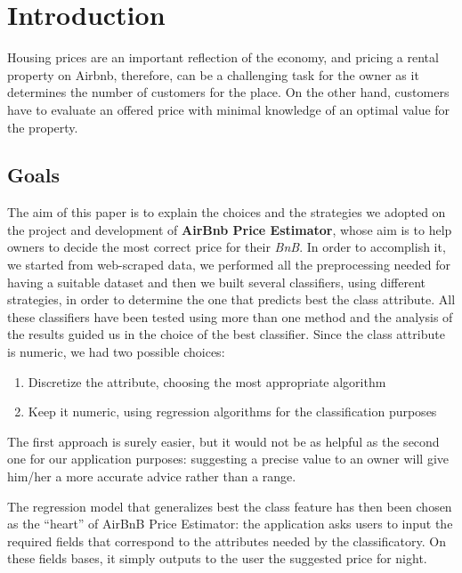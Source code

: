 \section{Introduction}
Housing prices are an important reflection of the economy, and pricing a rental property on Airbnb, therefore, can be a challenging task for the owner as it determines the number of customers for the place. On the other hand, customers have to evaluate an offered price with minimal knowledge of an optimal value for the property.

\subsection{Goals}
The aim of this paper is to explain the choices and the strategies we adopted on the project and development of \textbf{AirBnb Price Estimator}, whose aim is to help owners to decide the most correct price for their \textit{BnB}. 
In order to accomplish it, we started from web-scraped data, we performed all the preprocessing needed for having a suitable dataset and then we built several classifiers, using different strategies, in order to determine the one that predicts best the class attribute. All these classifiers have been tested using more than one method and the analysis of the results guided us in the choice of the best classifier.
Since the class attribute is numeric, we had two possible choices:

\begin{enumerate}
	\item Discretize the attribute, choosing the most appropriate algorithm
	\item Keep it numeric, using regression algorithms for the classification purposes
\end{enumerate}
The first approach is surely easier, but it would not be as helpful as the second one for our application purposes: suggesting a precise value to an owner will give him/her a more accurate advice rather than a range.

The regression model that generalizes best the class feature has then been chosen as the “heart” of AirBnB Price Estimator: the application asks users to input the required fields that correspond to the attributes needed by the classificatory. On these fields bases, it simply outputs to the user the suggested price for night.

